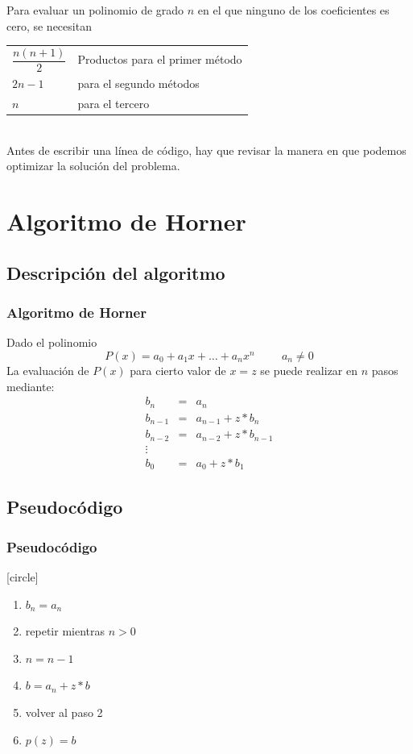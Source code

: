 \begin{frame}
Para evaluar un polinomio de grado $n$ en el que ninguno de los coeficientes es cero, se necesitan
\\
\medskip
\pause
\begin{tabular}{l l}
$\dfrac{n(n+1)}{2}$ & Productos para el primer método \\
$2n-1$ & para el segundo métodos \\
$n$ & para el tercero
\end{tabular}
\\
\medskip
Antes de escribir una línea de código, hay que revisar la manera en que podemos optimizar la solución del problema.
\end{frame}
\section{Algoritmo de Horner}
\subsection{Descripción del algoritmo}
\begin{frame}
\frametitle{Algoritmo de Horner}
Dado el polinomio
\[ P(x) = a_{0} + a_{1} x + \ldots + a_{n} x^{n} \hspace{1cm} a_{n} \neq 0 \]
La evaluación de $P(x)$ para cierto valor de $x=z$ se puede realizar en $n$ pasos mediante:
\begin{eqnarray*}
b_{n} &=& a_{n} \\
b_{n-1} &=& a_{n-1} + z*b_{n} \\
b_{n-2} &=& a_{n-2} + z*b_{n-1} \\
\vdots \\
b_{0} &=& a_{0}+z*b_{1}
\end{eqnarray*}
\end{frame}
\subsection{Pseudocódigo}
\begin{frame}
\frametitle{Pseudocódigo}
[circle]
\begin{enumerate}[<+->]
\item $b_{n} = a_{n}$
\item repetir mientras $n>0$
\item $n = n-1$
\item $b=a_{n}+z*b$
\item volver al paso 2
\item $p(z)=b$
\end{enumerate}
\end{frame}
